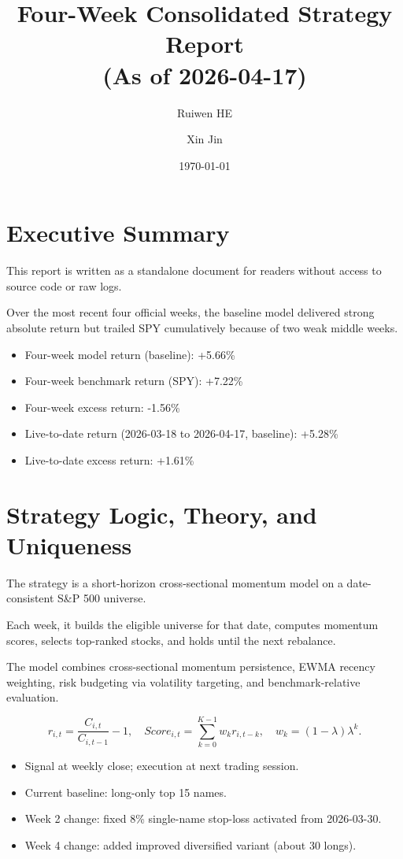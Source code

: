 \documentclass[11pt]{article}
\title{Four-Week Consolidated Strategy Report \\ (As of 2026-04-17)}
\author{Ruiwen HE \and Xin Jin}
\date{\today}
\begin{document}
\maketitle

\section{Executive Summary}
This report is written as a standalone document for readers without access to source code or raw logs.

Over the most recent four official weeks, the baseline model delivered strong absolute return but trailed SPY cumulatively because of two weak middle weeks.

\begin{itemize}
\item Four-week model return (baseline): +5.66\%
\item Four-week benchmark return (SPY): +7.22\%
\item Four-week excess return: -1.56\%
\item Live-to-date return (2026-03-18 to 2026-04-17, baseline): +5.28\%
\item Live-to-date excess return: +1.61\%
\end{itemize}

\section{Strategy Logic, Theory, and Uniqueness}
The strategy is a short-horizon cross-sectional momentum model on a date-consistent S\&P 500 universe.

Each week, it builds the eligible universe for that date, computes momentum scores, selects top-ranked stocks, and holds until the next rebalance.

The model combines cross-sectional momentum persistence, EWMA recency weighting, risk budgeting via volatility targeting, and benchmark-relative evaluation.

\begin{equation}
r_{i,t}=\frac{C_{i,t}}{C_{i,t-1}}-1,
\quad
Score_{i,t}=\sum_{k=0}^{K-1}w_k r_{i,t-k},
\quad
w_k=(1-\lambda)\lambda^k.
\end{equation}

\begin{itemize}
\item Signal at weekly close; execution at next trading session.
\item Current baseline: long-only top 15 names.
\item Week 2 change: fixed 8\% single-name stop-loss activated from 2026-03-30.
\item Week 4 change: added improved diversified variant (about 30 longs).
\end{itemize}
\end{document}
